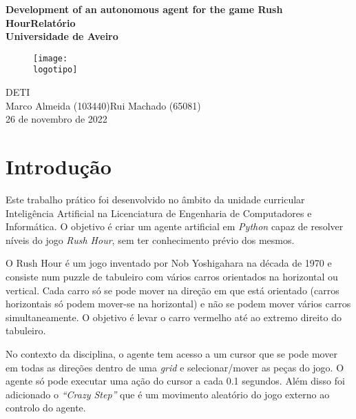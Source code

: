 \documentclass[12pt]{report}
\begin{document}
\def\titulo{\textbf{Development of an autonomous agent for the game Rush
Hour\break \break Relatório}}
\def\data{26 de novembro de 2022}
\def\autores{Marco Almeida (103440)\break Rui Machado (65081)}
\def\versao{}
\def\departamento{DETI}
\def\empresa{\textbf{Universidade de Aveiro}}
\def\logotipo{img/ua.pdf}


\begin{titlepage}

\begin{center}
%
\vspace*{50mm}
%
{\Huge \titulo}\\
%
\vspace{10mm}
%
{\Large \empresa}\\
%
\begin{figure}[h]
\center
\texttt{[image: \\logotipo]}
\end{figure}
%
\Large \departamento\\
%
\vspace{10mm}
%
{\Large \autores}\\
%
\vspace{10mm}
%
\Large \data\\
%
\end{center}
%
\end{titlepage}

\chapter{Introdução}
\par Este trabalho prático foi desenvolvido no âmbito da unidade curricular Inteligência Artificial na Licenciatura de Engenharia de Computadores e Informática. O objetivo é criar um agente artificial em \emph{Python} capaz de resolver níveis do jogo \emph{Rush Hour}, sem ter conhecimento prévio dos mesmos. 
  
\par O Rush Hour é um jogo inventado por Nob Yoshigahara na década de 1970 e consiste num puzzle de tabuleiro com vários carros orientados na horizontal ou vertical. Cada carro só se pode mover na direção em que está orientado (carros horizontais só podem mover-se na horizontal) e não se podem mover vários carros simultaneamente. O objetivo é levar o carro vermelho até ao extremo direito do tabuleiro.
  
\par No contexto da disciplina, o agente tem acesso a um cursor que se pode mover em todas as direções dentro de uma \emph{grid} e selecionar/mover as peças do jogo. O agente só pode executar uma ação do cursor a cada 0.1 segundos. Além disso foi adicionado o \emph{“Crazy Step”} que é um movimento aleatório do jogo externo ao controlo do agente.
  
\end{document}
